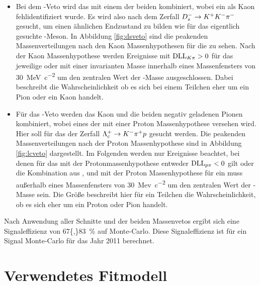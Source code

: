\begin{itemize}
\item Bei dem \Dsm-Veto wird das \Kp mit einem der beiden \pim kombiniert, wobei ein \pim als Kaon fehlidentifiziert wurde. Es wird also nach dem Zerfall ${{D}^-_{s}}\rightarrow{\ensuremath{{K}^+}}{\ensuremath{{K}^-}}{\ensuremath{{\pi}^-}}$ gesucht, um einen ähnlichen Endzustand zu bilden wie für das eigentlich gesuchte \Dm-Meson. In Abbildung \ref{fig:dsveto} sind die peakenden Massenverteilungen nach den Kaon Massenhypothesen für die \pim zu sehen. Nach der Kaon Massenhypothese werden Ereignisse mit $\mathrm{DLL}_{{K}{\pi}}>0$ für das jeweilige \pim oder mit einer invarianten Masse innerhalb eines Massenfensters von \SI{30}{MeV\per c^2} um den zentralen Wert der \Dsm-Masse ausgeschlossen. Dabei beschreibt \dllkpi die Wahrscheinlichkeit ob es sich bei einem Teilchen eher um ein Pion oder ein Kaon handelt.
\item Für das \Lc-Veto werden das Kaon und die beiden negativ geladenen Pionen kombiniert, wobei eines der \pim mit einer Proton Massenhypothese versehen wird. Hier soll für das \Lc der Zerfall ${{\Lambda}^+_{c}}\rightarrow{\ensuremath{{K}^-}}{\ensuremath{{\pi}^+}}{\ensuremath{p}}$ gesucht werden. Die peakenden Massenverteilungen nach der Proton Massenhypothese sind in Abbildung \ref{fig:lcveto} dargestellt. Im Folgenden werden nur Ereignisse beachtet, bei denen für das \pim mit der Protonmassenhypothese entweder $\mathrm{DLL}_{{p}{\pi}}<0$ gilt oder die Kombination aus \Kp, \pim und \pim mit der Proton Massenhypothese für ein \pim muss außerhalb eines Massenfensters von \SI{30}{Mev\per c^2} um den zentralen Wert der \Lc-Masse sein. Die Größe \dllppi beschreibt hier für ein Teilchen die Wahrscheinlichkeit, ob es sich eher um ein Proton oder Pion handelt.
\end{itemize}
Nach Anwendung aller Schnitte und der beiden Massenvetos ergibt sich eine Signaleffizienz von \SI{67{,}83}{\%} auf Monte-Carlo. Diese Signaleffizienz ist für ein Signal Monte-Carlo für das Jahr \num{2011} berechnet.
 
\section{Verwendetes Fitmodell}

